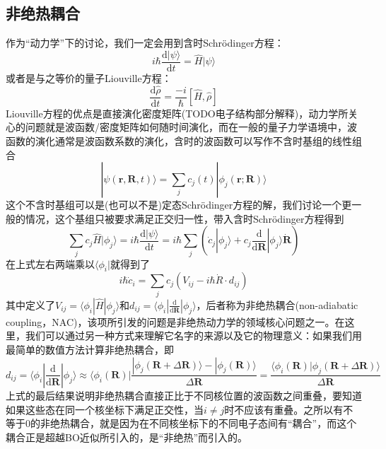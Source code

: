 \documentclass{article}
\numberwithin{equation}{section}
\begin{document}
      \subsection{非绝热耦合}
        作为“动力学”下的讨论，我们一定会用到含时Schr\"odinger方程：
        \begin{equation}
          i \hbar \frac{\mathrm{d} | \psi \rangle}{\mathrm{d} t}=\hat{H} | \psi \rangle
        \end{equation}
        或者是与之等价的量子Liouville方程：
        \begin{equation}
          \frac{\mathrm{d} \hat{\rho}}{\mathrm{d} t}=\frac{-i}{\hbar}[\hat{H}, \hat{\rho}]
        \end{equation}
        Liouville方程的优点是直接演化密度矩阵(TODO电子结构部分解释)，动力学所关心的问题就是波函数/密度矩阵如何随时间演化，而在一般的量子力学语境中，波函数的演化通常是波函数系数的演化，含时的波函数可以写作不含时基组的线性组合
        \begin{equation}
          |\psi(\mathbf{r}, \mathbf{R}, t)\rangle=\sum_{j} c_{j}(t) |\phi_{j}(\mathbf{r} ; \mathbf{R})\rangle
          \label{linear combination}
        \end{equation}
        这个不含时基组可以是(也可以不是)定态Schr\"odinger方程的解，我们讨论一个更一般的情况，这个基组只被要求满足正交归一性，带入含时Schr\"odinger方程得到
        \begin{equation}
          \sum_j c_j \hat{H}|\phi_j\rangle=i \hbar \frac{\mathrm{d} | \psi \rangle}{\mathrm{d} t}=i \hbar\sum_j\left(\dot{c}_j|\phi_j\rangle+c_j\frac{\mathrm{d}}{\mathrm{d}\mathbf{R}}|\phi_j\rangle\dot{\mathbf{R}}\right)
        \end{equation}
        在上式左右两端乘以$\langle\phi_i|$就得到了
        \begin{equation}
          i \hbar \dot{c}_{i}=\sum_{j} c_{j}\left(V_{i j}-i \hbar \dot{R} \cdot d_{i j}\right)
          \label{time-depend-coeff}
        \end{equation}
        其中定义了$V_{ij}=\langle\phi_i|\hat{H}|\phi_j\rangle$和$d_{ij}=\langle\phi_i|\frac{\mathrm{d}}{\mathrm{d}\mathbf{R}}|\phi_j\rangle$，后者称为非绝热耦合(non-adiabatic coupling，NAC)，该项所引发的问题是非绝热动力学的领域核心问题之一。在这里，我们可以通过另一种方式来理解它名字的来源以及它的物理意义：如果我们用最简单的数值方法计算非绝热耦合，即
        \begin{equation}
          d_{ij}=\langle\phi_i|\frac{\mathrm{d}}{\mathrm{d}\mathbf{R}}|\phi_j\rangle\approx\langle\phi_i(\mathbf{R})|\frac{|\phi_j(\mathbf{R}+\Delta\mathbf{R})\rangle-|\phi_j(\mathbf{R})\rangle}{\Delta\mathbf{R}}
          =\frac{\langle\phi_i(\mathbf{R})|\phi_j(\mathbf{R}+\Delta\mathbf{R})\rangle}{\Delta\mathbf{R}}
          \label{numerical dij}
        \end{equation}
        上式的最后结果说明非绝热耦合直接正比于不同核位置的波函数之间重叠，要知道如果这些态在同一个核坐标下满足正交性，当$i\neq j$时不应该有重叠。之所以有不等于0的非绝热耦合，就是因为在不同核坐标下的不同电子态间有“耦合”，而这个耦合正是超越BO近似所引入的，是“非绝热”而引入的。
\end{document}
